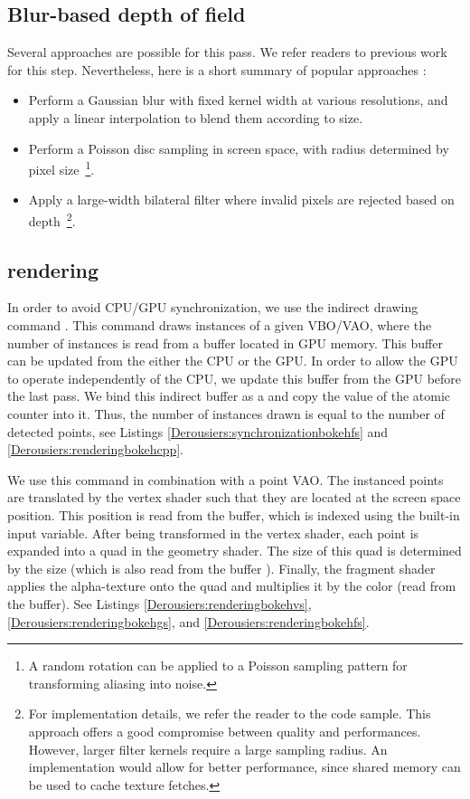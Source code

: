 \subsection{Blur-based depth of field}
Several approaches are possible for this pass. We refer readers to previous work for this step. Nevertheless, here is a short summary of popular approaches :
\begin{itemize}
	\item Perform a Gaussian blur with fixed kernel width at various resolutions, and apply a linear interpolation to blend them according to \coc size.
	\item Perform a Poisson disc sampling in screen space, with radius determined by pixel \coc size~\footnote{A random rotation can be applied to a Poisson sampling pattern for transforming aliasing into noise.}.
	\item Apply a large-width bilateral filter where invalid pixels are rejected based on depth~\footnote{For implementation details, we refer the reader to the code sample. This approach offers a good compromise between quality and performances. However, larger filter kernels require a large sampling radius. An \opencl implementation would allow for better performance, since shared memory can be used to cache texture fetches.}.
\end{itemize}


\subsection{\Bokeh rendering}
In order to avoid CPU/GPU synchronization, we use the indirect drawing command . This command draws instances of a given VBO/VAO, where the number of instances is read from a buffer located in GPU memory. This buffer can be updated from the either the CPU or the GPU. In order to allow the GPU to operate independently of the CPU, we update this buffer from the GPU before the last pass. We bind this indirect buffer as a  and copy the value of the atomic counter into it. Thus, the number of instances drawn is equal to the number of detected \bokeh points, see Listings \ref{Derousiers:synchronizationbokehfs} and \ref{Derousiers:renderingbokehcpp}.

We use this command in combination with a point VAO. The instanced points are translated by the vertex shader such that they are located at the screen space \bokeh position. This position is read from the  buffer, which is indexed using the built-in  input variable. After being transformed in the vertex shader, each point is expanded into a quad in the geometry shader. The size of this quad is determined by the \bokeh size (which is also read from the  buffer ). Finally, the fragment shader applies the \bokeh alpha-texture onto the quad and multiplies it by the \bokeh color (read from the  buffer). See Listings \ref{Derousiers:renderingbokehvs}, \ref{Derousiers:renderingbokehgs}, and \ref{Derousiers:renderingbokehfs}.

